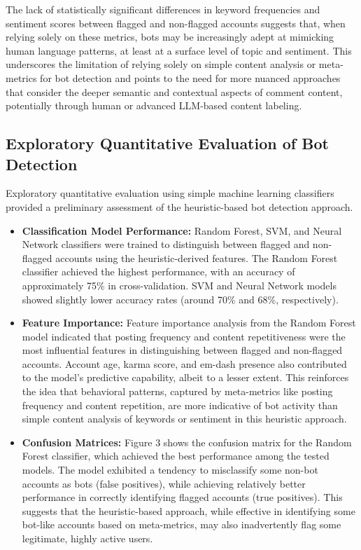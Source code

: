 \documentclass[
  12pt,
  letterpaper,
  DIV=11,
  numbers=noendperiod]{scrartcl}
\begin{document}
The lack of statistically significant differences in keyword frequencies
and sentiment scores between flagged and non-flagged accounts suggests
that, when relying solely on these metrics, bots may be increasingly
adept at mimicking human language patterns, at least at a surface level
of topic and sentiment. This underscores the limitation of relying
solely on simple content analysis or meta-metrics for bot detection and
points to the need for more nuanced approaches that consider the deeper
semantic and contextual aspects of comment content, potentially through
human or advanced LLM-based content labeling.

\subsection{Exploratory Quantitative Evaluation of Bot
Detection}\label{exploratory-quantitative-evaluation-of-bot-detection}

Exploratory quantitative evaluation using simple machine learning
classifiers provided a preliminary assessment of the heuristic-based bot
detection approach.

\begin{itemize}
\item
  \textbf{Classification Model Performance:} Random Forest, SVM, and
  Neural Network classifiers were trained to distinguish between flagged
  and non-flagged accounts using the heuristic-derived features. The
  Random Forest classifier achieved the highest performance, with an
  accuracy of approximately 75\% in cross-validation. SVM and Neural
  Network models showed slightly lower accuracy rates (around 70\% and
  68\%, respectively).
\item
  \textbf{Feature Importance:} Feature importance analysis from the
  Random Forest model indicated that posting frequency and content
  repetitiveness were the most influential features in distinguishing
  between flagged and non-flagged accounts. Account age, karma score,
  and em-dash presence also contributed to the model's predictive
  capability, albeit to a lesser extent. This reinforces the idea that
  behavioral patterns, captured by meta-metrics like posting frequency
  and content repetition, are more indicative of bot activity than
  simple content analysis of keywords or sentiment in this heuristic
  approach.
\item
  \textbf{Confusion Matrices:} Figure 3 shows the confusion matrix for
  the Random Forest classifier, which achieved the best performance
  among the tested models. The model exhibited a tendency to misclassify
  some non-bot accounts as bots (false positives), while achieving
  relatively better performance in correctly identifying flagged
  accounts (true positives). This suggests that the heuristic-based
  approach, while effective in identifying some bot-like accounts based
  on meta-metrics, may also inadvertently flag some legitimate, highly
  active users.
\end{itemize}
\end{document}
